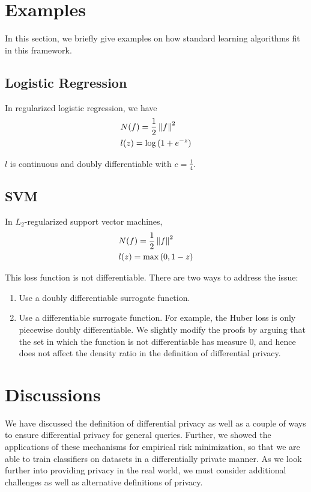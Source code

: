 \documentclass{article} %
\begin{document}
\section{Examples}
In this section, we briefly give examples on how standard learning algorithms fit in this framework.
	\subsection{Logistic Regression}
	In regularized logistic regression, we have
	\begin{align*}
	& N(f) = \frac{1}{2} \left\lVert f\right\rVert^2\\
	& l(z) = \log{(1 + e^{-z})}
	\end{align*}

	$l$ is continuous and doubly differentiable with $c = \frac{1}{4}$.
	\subsection{SVM}
	In $L_2$-regularized support vector machines,
	\begin{align*}
	& N(f) = \frac{1}{2} \left\lVert f\right\rVert^2\\
	& l(z) = \max{(0, 1 - z)}
	\end{align*}

	This loss function is not differentiable. There are two ways to address the issue:
	\begin{enumerate}[label=(\roman*)]
		\item Use a doubly differentiable surrogate function.
		\item Use a differentiable surrogate function.
		For example, the Huber loss is only piecewise doubly differentiable. We slightly modify the proofs by arguing that the set in which the function is not differentiable has measure $0$, and hence does not affect the density ratio in the definition of differential privacy.
	\end{enumerate}

\section{Discussions}

We have discussed the definition of differential privacy as well as a couple of
ways to ensure differential privacy for general queries. Further, we showed the
applications of these mechanisms for empirical risk minimization, so that we
are able to train classifiers on datasets in a differentially private manner.
As we look further into providing privacy in the real world, we must consider
additional challenges as well as alternative definitions of privacy.
\end{document}
